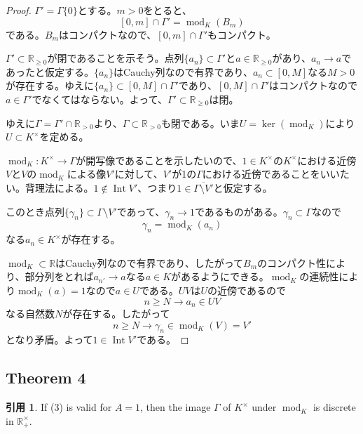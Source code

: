 \documentclass[12pt]{jsarticle}%
\renewenvironment{leftbar}{%
  \renewcommand\FrameCommand{\vrule width 1pt \hspace{10pt}}%
  \MakeFramed {\advance\hsize-\width \FrameRestore}}%
 {\endMakeFramed}
\newcommand{\barquo}[1]{\begin{leftbar} \begin{quo} #1 \end{quo} \end{leftbar}}%
\newcommand{\bfsubsection}[1]{\subsection*{\textbf{#1}}}
\theoremstyle{definition}%
\newtheorem*{quo}{引用}
\DeclareMathOperator{\module}{mod}%
\DeclareMathOperator{\Int}{Int}
\newcommand{\bbr}{{\mathbb R}}
\newcommand{\R}{\bbr}
\begin{document}
\begin{proof}
$\Gamma' = \Gamma \{0 \}$とする。$m>0$をとると、
\[
[0,m] \cap \Gamma' = \module_K (B_m)
\]
である。$B_m$はコンパクトなので、$[0,m] \cap \Gamma'$もコンパクト。\par
$\Gamma' \subset \R_{\geq 0}$が閉であることを示そう。点列$\{ a_n \} \subset \Gamma'$と$a \in \R_{\geq 0}$があり、$a_n \rightarrow  a$であったと仮定する。$\{ a_n \}$はCauchy列なので有界であり、${a_n} \subset [0,M]$なる$M>0$が存在する。ゆえに$\{ a_n \} \subset [0,M] \cap \Gamma'$であり、$[0,M] \cap \Gamma'$はコンパクトなので$a \in \Gamma'$でなくてはならない。よって、$\Gamma' \subset \R_{\geq 0}$は閉。\par
ゆえに$\Gamma = \Gamma' \cap \R_{>0}$より、$\Gamma \subset \R_{>0}$も閉である。いま$U=\ker (\module_K)$により$U \subset K^{\times}$を定める。\par
$\module_K  \colon K^{\times} \rightarrow \Gamma$が開写像であることを示したいので、$1 \in K^{\times}$の$K^{\times}$における近傍$V$と$V$の$\module_K$による像$V'$に対して、$V'$が1の$\Gamma$における近傍であることをいいたい。背理法による。$1 \notin \Int V'$、つまり$1 \in \overline{\Gamma \setminus V'}$と仮定する。\par
このとき点列$\{ \gamma_n \} \subset \Gamma \setminus V'$であって、$\gamma_n \rightarrow 1$であるものがある。$\gamma_n \subset \Gamma $なので
\[
\gamma_n = \module_K(a_n)
\]
なる$a_n \in K^{\times }$が存在する。\par
$\module_K \subset \R$はCauchy列なので有界であり、したがって$B_m$のコンパクト性により、部分列をとれば$a_{n'} \rightarrow a$なる$a \in K$があるようにできる。$\module_K$の連続性により$\module_K(a)=1$なので$a\in U$である。$UV$は$U$の近傍であるので
\[
n \geq N \rightarrow a_n \in UV
\]
なる自然数$N$が存在する。したがって
\[
n \geq N \rightarrow \gamma_n \in \module_K(V)=V'
\]
となり矛盾。よって$1 \in \Int V'$である。
\end{proof}

\bfsubsection{Theorem 4}
\barquo{
If (3) is valid for $A=1$, then the image $\Gamma$ of $K^{\times}$ under $\module_K$ is discrete in $\R_+^{\times}$.
}
\end{document}
